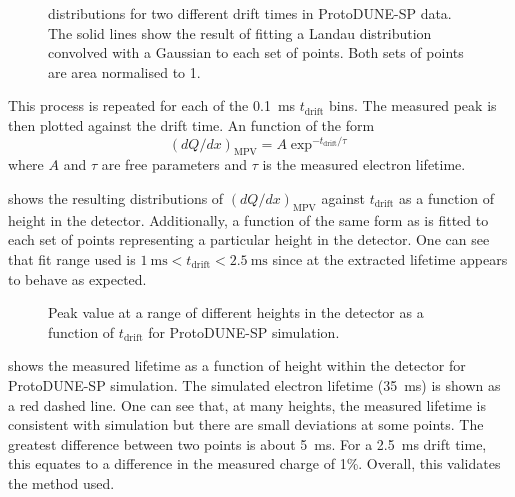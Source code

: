 \begin{figure}[h]
	\begin{adjustbox}{max totalsize=.8\linewidth, center}
		
	\end{adjustbox}
	\caption[\dqdx distributions for two different drift times in ProtoDUNE-SP]{\dqdx distributions for two different drift times in ProtoDUNE-SP data. The solid lines show the result of fitting a Landau distribution convolved with a Gaussian to each set of points. Both sets of points are area normalised to 1.}
	\label{fig:dqdx1d}
\end{figure}

This process is repeated for each of the \SI{0.1}{\ms} $t_{\text{drift}}$ bins.
The measured peak is then plotted against the drift time.
An function of the form 
\begin{equation}
	(dQ/dx)_{\text{MPV}} = A \exp^{-t_{\text{drift}}/\tau}
	\label{eq:lifetimeFromdqdx}
\end{equation}
where $A$ and $\tau$ are free parameters and $\tau$ is the measured electron lifetime.

 shows the resulting distributions of $(dQ/dx)_{\text{MPV}}$ against $t_{\text{drift}}$ as a function of height in the detector.
Additionally, a function of the same form as  is fitted to each set of points representing a particular height in the detector.
One can see that fit range used is $\SI{1}{\ms} < t_{\text{drift}} < \SI{2.5}{\ms}$ since at the extracted lifetime appears to behave as expected.

\begin{figure}[h]
	\begin{adjustbox}{max totalsize=.6\linewidth, center}
		
	\end{adjustbox}
	\caption[Peak \dqdx value at a range of different heights in the detector as a function of $t_{\text{drift}}$ in simulation]{Peak \dqdx value at a range of different heights in the detector as a function of $t_{\text{drift}}$ for ProtoDUNE-SP simulation.}
	\label{fig:mgPeakDriftMcNoSCE}
\end{figure}

 shows the measured lifetime as a function of height within the detector for ProtoDUNE-SP simulation. 
The simulated electron lifetime (\SI{35}{\ms}) is shown as a red dashed line.
One can see that, at many heights, the measured lifetime is consistent with simulation but there are small deviations at some points.
The greatest difference between two points is about \SI{5}{\ms}.
For a \SI{2.5}{\ms} drift time, this equates to a difference in the measured charge of 1\%.
Overall, this validates the method used.

